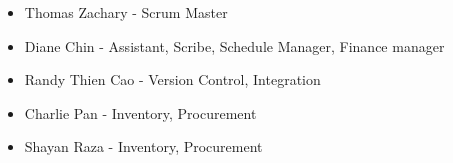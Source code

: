 \begin{itemize}
    \item Thomas Zachary - Scrum Master
    \item Diane Chin - Assistant, Scribe, Schedule Manager, Finance manager
    \item Randy Thien Cao - Version Control, Integration
    \item Charlie Pan - Inventory, Procurement
    \item Shayan Raza - Inventory, Procurement
\end{itemize}